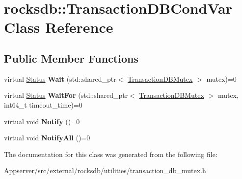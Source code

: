 \hypertarget{classrocksdb_1_1TransactionDBCondVar}{}\section{rocksdb\+:\+:Transaction\+D\+B\+Cond\+Var Class Reference}
\label{classrocksdb_1_1TransactionDBCondVar}
\subsection*{Public Member Functions}
\begin{DoxyCompactItemize}
\item 
virtual \hyperlink{classrocksdb_1_1Status}{Status} {\bfseries Wait} (std\+::shared\+\_\+ptr$<$ \hyperlink{classrocksdb_1_1TransactionDBMutex}{Transaction\+D\+B\+Mutex} $>$ mutex)=0\hypertarget{classrocksdb_1_1TransactionDBCondVar_a7c81f8c60ef35dcca12a4346c4f49f80}{}\label{classrocksdb_1_1TransactionDBCondVar_a7c81f8c60ef35dcca12a4346c4f49f80}

\item 
virtual \hyperlink{classrocksdb_1_1Status}{Status} {\bfseries Wait\+For} (std\+::shared\+\_\+ptr$<$ \hyperlink{classrocksdb_1_1TransactionDBMutex}{Transaction\+D\+B\+Mutex} $>$ mutex, int64\+\_\+t timeout\+\_\+time)=0\hypertarget{classrocksdb_1_1TransactionDBCondVar_a80e841aee13cbf3064af032c8b58f5de}{}\label{classrocksdb_1_1TransactionDBCondVar_a80e841aee13cbf3064af032c8b58f5de}

\item 
virtual void {\bfseries Notify} ()=0\hypertarget{classrocksdb_1_1TransactionDBCondVar_a72ab0bd8c4b9ed453ebee59cf6ef2603}{}\label{classrocksdb_1_1TransactionDBCondVar_a72ab0bd8c4b9ed453ebee59cf6ef2603}

\item 
virtual void {\bfseries Notify\+All} ()=0\hypertarget{classrocksdb_1_1TransactionDBCondVar_a6397e23c9dabb9db4e9efca328f92f92}{}\label{classrocksdb_1_1TransactionDBCondVar_a6397e23c9dabb9db4e9efca328f92f92}

\end{DoxyCompactItemize}


The documentation for this class was generated from the following file\+:\begin{DoxyCompactItemize}
\item 
Appserver/src/external/rocksdb/utilities/transaction\+\_\+db\+\_\+mutex.\+h\end{DoxyCompactItemize}
